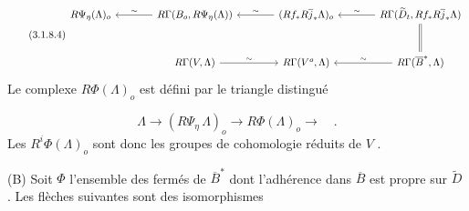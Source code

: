 \begin{equation}\tag{3.1.8.4}
\begin{tikzcd}[column sep=large, row sep=large]
R\Psi_\eta(\Lambda)_o & R\Gamma(B_o, R\Psi_\eta(\Lambda)) \arrow[l, "\sim"'] & (Rf_* R\overline{j}_* \Lambda)_o \arrow[l, "\sim"'] & R\Gamma(\widetilde{D}_t, Rf_* R\overline{j}_* \Lambda) \arrow[l, "\sim"'] \arrow[d, equal] \\
{} & R\Gamma(V, \Lambda) \arrow[r, "\sim"] & R\Gamma(V^o, \Lambda) & R\Gamma(\overline{B}^*, \Lambda) \arrow[l, "\sim"']
\end{tikzcd}
\end{equation}
Le complexe $R\Phi(\Lambda)_o$ est défini par le triangle distingué

\begin{equation*}
\Lambda \longrightarrow (R\Psi_\eta \, \Lambda)_o \longrightarrow R\Phi(\Lambda)_o \longrightarrow \quad .
\end{equation*}
Les $R^i\Phi(\Lambda)_o$ sont donc les groupes de cohomologie réduits de $V$ .

(B) Soit $\Phi$ l'ensemble des fermés de $\overline{B}^*$ dont l'adhérence dans $\overline{B}$ est propre sur $\widetilde{D}$ . Les flèches suivantes sont des isomorphismes

